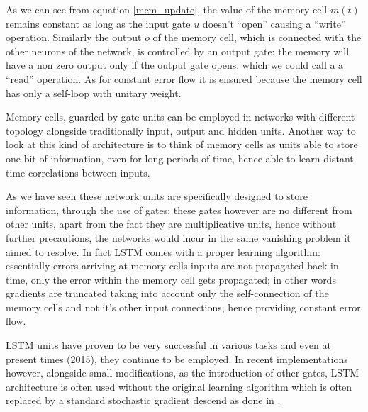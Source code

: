% 
% 

As we can see from equation \ref{mem_update}, the value of the memory cell $m(t)$ remains constant as long as the input 
gate $u$ doesn't ``open'' causing a ``write'' operation. Similarly the output $o$ of the memory cell, which is 
connected with 
the other neurons of the network, is controlled by an output gate: the memory will have a non zero output only if the 
output gate opens, which we could call a  a ``read'' operation. As for constant error flow it is ensured because the 
memory cell has only a self-loop with unitary weight.

Memory cells, guarded by gate units can be employed in networks with different topology alongside traditionally 
input, output and hidden units. Another way to look at this kind of architecture is to think of memory cells as units 
able to store one bit of information, even for long periods of time, hence able to learn distant time correlations 
between inputs.

As we have seen these network units are specifically designed to store information, through the use of gates; these 
gates however are no different from other units, apart from the fact they are multiplicative units, hence without 
further precautions, the networks would incur in the same vanishing problem it aimed to resolve. In fact LSTM comes with 
a proper learning algorithm: essentially errors arriving at memory cells inputs are not propagated back in time, only 
the error within the memory cell gets propagated; in other words gradients are truncated taking into account only the 
self-connection of the memory cells and not it's other input connections, hence providing constant error flow.

LSTM units have proven to be very successful in various tasks and even at present times (2015), they continue to be 
employed. In recent implementations however, alongside small modifications, as the introduction of other gates, LSTM 
architecture is often used without the original learning algorithm which is often replaced by a standard stochastic 
gradient descend as done in \cite{lstmGraves}.







